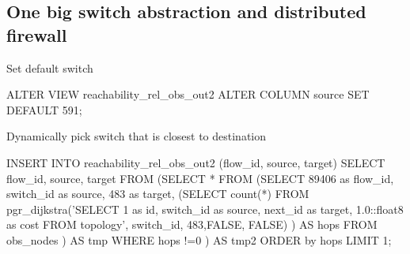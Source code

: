 \subsection{One big switch abstraction and distributed firewall}

Set default switch 
\begin{sql}
ALTER VIEW reachability_rel_obs_out2 ALTER COLUMN source SET DEFAULT 591;  
\end{sql}


Dynamically pick switch that is closest to destination
\begin{sql}
INSERT INTO reachability_rel_obs_out2  (flow_id, source, target)
SELECT flow_id, source, target FROM
       (SELECT * FROM
       	       (SELECT 89406 as flow_id,
	       	       switch_id as source,
	       	       483 as target, 
		       (SELECT count(*) FROM
		        pgr_dijkstra('SELECT 1 as id, switch_id as source,
					     next_id as target,
					     1.0::float8 as cost
			              FROM topology', switch_id, 483,FALSE, FALSE)
                       ) AS hops 
                FROM obs_nodes
	       ) AS tmp WHERE hops !=0
       ) AS tmp2 ORDER by hops LIMIT 1;  
\end{sql}
